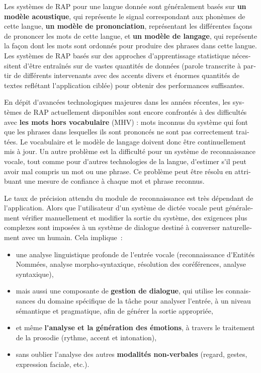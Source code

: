 \documentclass[]{../metanetpaper}
\begin{document}
\begin{french}
\begin{multicols}{2}
Les systèmes de RAP pour une langue donnée sont généralement basés sur
{\bf un modèle acoustique}, qui représente le signal correspondant aux
phonèmes de cette langue, {\bf un modèle de prononciation},
représentant les différentes façons de prononcer les mots de cette
langue, et {\bf un modèle de langage}, qui représente la façon dont
les mots sont ordonnés pour produire des phrases dans cette
langue. Les systèmes de RAP basés sur des approches d{\mbox
  '}apprentissage statistique nécessitent d{\mbox '}être entraînés sur
de vastes quantités de données (parole transcrite à partir de
différents intervenants avec des accents divers et énormes quantités
de textes reflétant l{\mbox '}application ciblée) pour obtenir des
performances suffisantes.

En dépit d{\mbox '}avancées technologiques majeures dans les années récentes,
les systèmes de RAP actuellement disponibles sont encore confrontés à
des difficultés avec {\bf les mots hors vocabulaire} (MHV) : mots
inconnus du système qui font que les phrases dans lesquelles ils sont
prononcés ne sont pas correctement traitées. Le vocabulaire et le
modèle de langage doivent donc être continuellement mis à jour. Un
autre problème est la difficulté pour un système de reconnaissance
vocale, tout comme pour d{\mbox '}autres technologies de la langue,
d{\mbox '}estimer s{\mbox '}il peut avoir mal compris un mot ou une phrase. Ce
problème peut être résolu en attribuant une mesure de confiance à
chaque mot et phrase reconnus.

Le taux de précision attendu du module de reconnaissance est très
dépendant de l{\mbox '}application. Alors que l{\mbox '}utilisateur d{\mbox '}un système de
dictée vocale peut généralement vérifier manuellement et modifier la
sortie du système, des exigences plus complexes sont imposées à un
système de dialogue destiné à converser naturellement avec un
humain. Cela implique~: 
\begin{itemize}
\item une analyse linguistique profonde de l{\mbox '}entrée vocale
  (reconnaissance d{\mbox '}Entités Nommées, analyse morpho-syntaxique,
  résolution des coréférences, analyse syntaxique),
\item mais aussi une composante de {\bf gestion de dialogue}, qui
  utilise les connaissances du domaine spécifique de la tâche pour
  analyser l{\mbox '}entrée, à un niveau sémantique et pragmatique, afin de
  générer la sortie appropriée,
\item et même {\bf l{\mbox '}analyse et la génération des émotions}, à
  travers le traitement de la prosodie (rythme, accent et intonation),
\item sans oublier l{\mbox '}analyse des autres {\bf modalités non-verbales}
  (regard, gestes, expression faciale, etc.).
\end{itemize}


\end{multicols}
\end{french}
\end{document}
